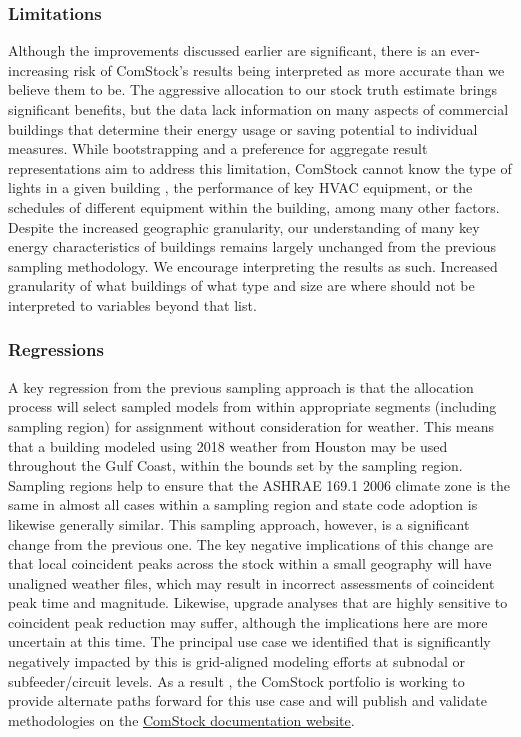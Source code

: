 \subsubsection{Limitations}
Although the improvements discussed earlier are significant, there is an ever-increasing risk of ComStock's results being interpreted as more accurate than we believe them to be. The aggressive allocation to our stock truth estimate brings significant benefits, but the data lack information on many aspects of commercial buildings that determine their energy usage or saving potential to individual measures. While bootstrapping and a preference for aggregate result representations aim to address this limitation, ComStock cannot know the type of lights in a given building , the performance of key HVAC equipment, or the schedules of different equipment within the building, among many other factors. Despite the increased geographic granularity, our understanding of many key energy characteristics of buildings remains largely unchanged from the previous sampling methodology. We encourage interpreting the results as such. Increased granularity of what buildings of what type and size are where should not be interpreted to variables beyond that list.

\subsubsection{Regressions}
A key regression from the previous sampling approach is that the allocation process will select sampled models from within appropriate segments (including sampling region) for assignment without consideration for weather. This means that a building modeled using 2018 weather from Houston may be used throughout the Gulf Coast, within the bounds set by the sampling region. Sampling regions help to ensure that the ASHRAE 169.1 2006 climate zone is the same in almost all cases within a sampling region and state code adoption is likewise generally similar. This sampling approach, however, is a significant change from the previous one. The key negative implications of this change are that local coincident peaks across the stock within a small geography will have unaligned weather files, which may result in incorrect assessments of coincident peak time and magnitude. Likewise, upgrade analyses that are highly sensitive to coincident peak reduction may suffer, although the implications here are more uncertain at this time. The principal use case we identified that is significantly negatively impacted by this is grid-aligned modeling efforts at subnodal or subfeeder/circuit levels. As a result , the ComStock portfolio is working to provide alternate paths forward for this use case and will publish and validate methodologies on the \href{https://nrel.github.io/ComStock.github.io/}{ComStock documentation website}.